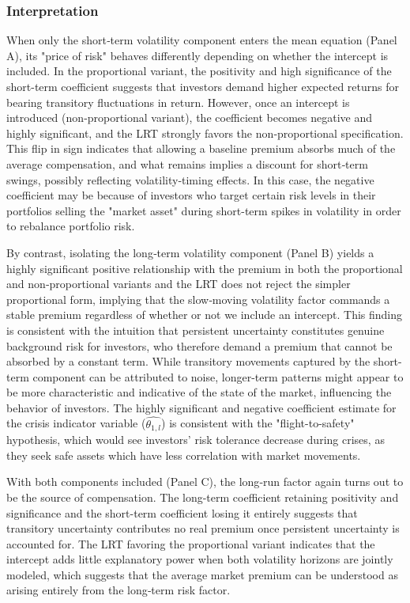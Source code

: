 \documentclass[12pt]{article}
\begin{document}
\subsubsection{Interpretation}
When only the short‐term volatility component enters the mean equation (Panel A), its "price of risk" behaves differently depending on whether the intercept is included. In the proportional variant, the positivity and high significance of the short-term coefficient suggests that investors demand higher expected returns for bearing transitory fluctuations in return. However, once an intercept is introduced (non‑proportional variant), the coefficient becomes negative and highly significant, and the LRT strongly favors the non‑proportional specification. This flip in sign indicates that allowing a baseline premium absorbs much of the average compensation, and what remains implies a discount for short‐term swings, possibly reflecting volatility‐timing effects. In this case, the negative coefficient may be because of investors who target certain risk levels in their portfolios selling the "market asset" during short-term spikes in volatility in order to rebalance portfolio risk.\par
By contrast, isolating the long‑term volatility component (Panel B) yields a highly significant positive relationship with the premium in both the proportional and non‑proportional variants and the LRT does not reject the simpler proportional form, implying that the slow‐moving volatility factor commands a stable premium regardless of whether or not we include an intercept. This finding is consistent with the intuition that persistent uncertainty constitutes genuine background risk for investors, who therefore demand a premium that cannot be absorbed by a constant term. While transitory movements captured by the short-term component can be attributed to noise, longer-term patterns might appear to be more characteristic and indicative of the state of the market, influencing the behavior of investors. The highly significant and negative coefficient estimate for the crisis indicator variable ($\widehat{\theta_{1,l}}$) is consistent with the "flight-to-safety" hypothesis, which would see investors' risk tolerance decrease during crises, as they seek safe assets which have less correlation with market movements.\par
With both components included (Panel C), the long‑run factor again turns out to be the source of compensation. The long-term coefficient retaining positivity and significance and the short-term coefficient losing it entirely suggests that transitory uncertainty contributes no real premium once persistent uncertainty is accounted for. The LRT favoring the proportional variant indicates that the intercept adds little explanatory power when both volatility horizons are jointly modeled, which suggests that the average market premium can be understood as arising entirely from the long‑term risk factor.\par
\end{document}
